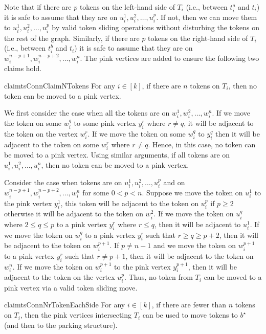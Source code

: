 Note that if there are $p$ tokens on the left-hand side of $T_i$
(i.e., between $t_i^a$ and $t_i$) it is safe to assume that they are
on $u_i^1,u_i^2,\ldots,u_i^p$.
If not, then we can move them to $u_i^1,u_i^2,\ldots,u_i^p$ by valid
token sliding operations without disturbing the tokens on
the rest of the graph.
Similarly, if there are $p$ tokens on the right-hand side of $T_i$
(i.e., between $t_i^b$ and $t_i$) it is safe to assume that they are on
$w_i^{n-p+1},w_i^{n-p+2},\ldots,w_i^n$.
The pink vertices are added to ensure the following two
claims hold.
\begin{restatable}{claim}{tsConnClaimNTokens}
\label{cl:ntokens}
For any $i \in [k]$, if there are $n$ tokens on $T_i$, then no token
can be moved to a pink vertex.
\end{restatable}
\begin{claimproof}
We first consider the case when all the tokens are on
${w_i^1,w_i^2,\ldots,w_i^n}$.
If we move the token on some $w_i^q$ to some pink vertex $y_i^r$
where $r\neq q$, it will be adjacent to the token on the vertex $w_i^r$.
If we move the token on some $w_i^q$ to $y_i^q$ then it
will be adjacent to the token on some $w_i^r$ where $r\neq q$.
Hence, in this case, no token can be moved to a pink vertex.
Using similar arguments, if all tokens are
on ${u_i^1,u_i^2,\ldots,u_i^n}$, then no token can be moved to a pink vertex.

Consider the case when tokens are on ${u_i^1,u_i^2,\ldots,u_i^p}$
and on ${w_i^{n-p+1},w_i^{n-p+2},\ldots,w_i^n}$
for some $0<p<n$.
Suppose we move the token on $u_i^1$ to the pink vertex $y_i^1$,
this token will be adjacent to the token on $u_i^p$ if $p\geq2$
otherwise it will be adjacent to the token on $w_i^2$.
If we move the token on $u_i^q$ where $2\leq q \leq p$
to a pink vertex $y_i^r$ where $r\leq q$,
then it will be adjacent to $u_i^1$.
If we move the token on $w_i^q$ to a pink vertex $y_i^r$
such that $r\geq q\geq p+2$, then it will be adjacent to
the token on $w_i^{p+1}$.
If $p\neq n-1$ and we move the token on $w_i^{p+1}$
to a pink vertex $y_i^r$ such that $r\neq p+1$,
then it will be adjacent to the token on $w_i^n$.
If we move the token on $w_i^{p+1}$ to the pink vertex
$y_i^{p+1}$, then it will be adjacent to the token on the vertex $u_i^p$.
Thus, no token from $T_i$ can be moved to a pink vertex via a valid token sliding move.
\end{claimproof}
\begin{restatable}{claim}{tsConnNrTokenEachSide}
\label{cl:lessthann}
For any $i \in [k]$, if there are fewer than $n$ tokens on $T_i$, then
the pink vertices intersecting $T_i$ can be used to move tokens to $b^{\star}$ (and then to the parking structure).
\end{restatable}
